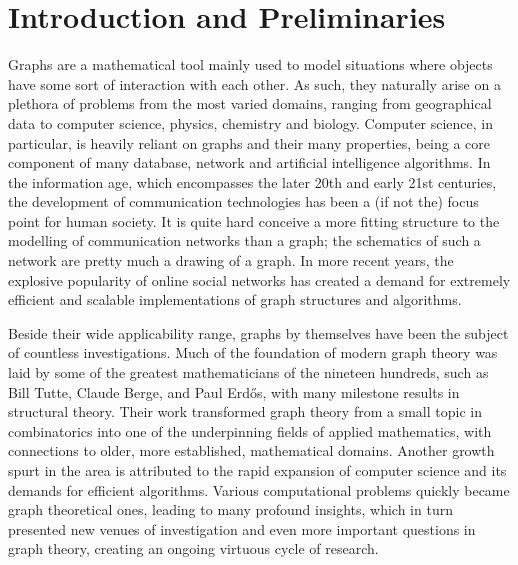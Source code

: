 \chapter{Introduction and Preliminaries}
\label{ch:intro}

Graphs are a mathematical tool mainly used to model situations where objects have some sort of interaction with each other.
As such, they naturally arise on a plethora of problems from the most varied domains, ranging from geographical data to computer science, physics, chemistry and biology.
Computer science, in particular, is heavily reliant on graphs and their many properties, being a core component of many database, network and artificial intelligence algorithms.
In the information age, which encompasses the later 20th and early 21st centuries, the development of communication technologies has been a (if not the) focus point for human society.
It is quite hard conceive a more fitting structure to the modelling of communication networks than a graph; the schematics of such a network are pretty much a drawing of a graph.
In more recent years, the explosive popularity of online social networks has created a demand for extremely efficient and scalable implementations of graph structures and algorithms.

Beside their wide applicability range, graphs by themselves have been the subject of countless investigations.
Much of the foundation of modern graph theory was laid by some of the greatest mathematicians of the nineteen hundreds, such as Bill Tutte, Claude Berge, and Paul Erd\H{o}s, with many milestone results in structural theory.
Their work transformed graph theory from a small topic in combinatorics into one of the underpinning fields of applied mathematics, with connections to older, more established, mathematical domains.
Another growth spurt in the area is attributed to the rapid expansion of computer science and its demands for efficient algorithms.
Various computational problems quickly became graph theoretical ones, leading to many profound insights, which in turn presented new venues of investigation and even more important questions in graph theory, creating an ongoing virtuous cycle of research.

